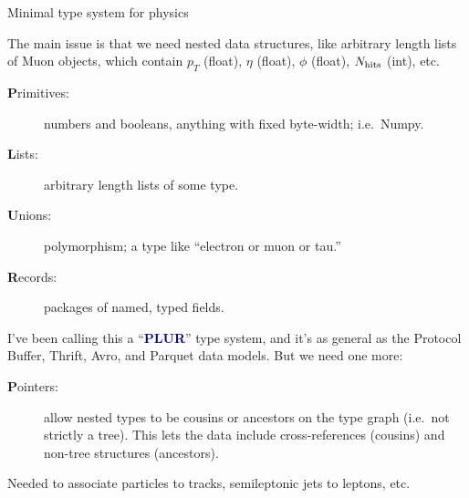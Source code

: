 \documentclass[aspectratio=169]{beamer}
\begin{document}
\begin{frame}{Minimal type system for physics}
\vspace{0.5 cm}

The main issue is that we need nested data structures, like arbitrary length lists of Muon objects, which contain $p_T$ (float), $\eta$ (float), $\phi$ (float), $N_{\mbox{\scriptsize hits}}$ (int), etc.

\large
\begin{description}
\item[{\bf P}rimitives:] numbers and booleans, anything with fixed byte-width; i.e.\ Numpy.

\item[{\bf L}ists:] arbitrary length lists of some type.

\item[{\bf U}nions:] polymorphism; a type like ``electron or muon or tau.''

\item[{\bf R}ecords:] packages of named, typed fields.
\end{description}

\normalsize I've been calling this a ``\textcolor{darkblue}{\bf PLUR}'' type system, and it's as general as the Protocol Buffer, Thrift, Avro, and Parquet data models. But we need one more:

\large
\begin{description}
\item[{\bf P}ointers:] allow nested types to be cousins or ancestors on the type graph (i.e.\ not strictly a tree). This lets the data include cross-references (cousins) and non-tree structures (ancestors).
\end{description}

\normalsize Needed to associate particles to tracks, semileptonic jets to leptons, etc.
\end{frame}
\end{document}
